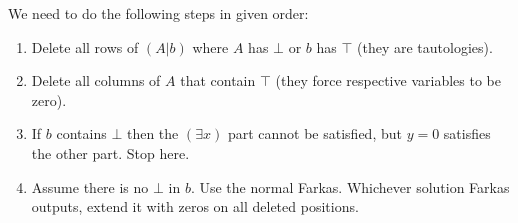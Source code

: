 \documentclass[]{article}
\begin{document}
We need to do the following steps in given order:
\begin{enumerate}
\item Delete all rows of $(A|b)$ where $A$ has $\bot$ or $b$ has $\top$
(they are tautologies).
\item Delete all columns of $A$ that contain $\top$
(they force respective variables to be zero).
\item If $b$ contains $\bot$ then the $(\exists x)$ part cannot be satisfied,
but $y = 0$ satisfies the other part. Stop here.
\item Assume there is no $\bot$ in $b$. Use the normal Farkas.
Whichever solution Farkas outputs, extend it with zeros on
all deleted positions.
\end{enumerate}
\end{document}
